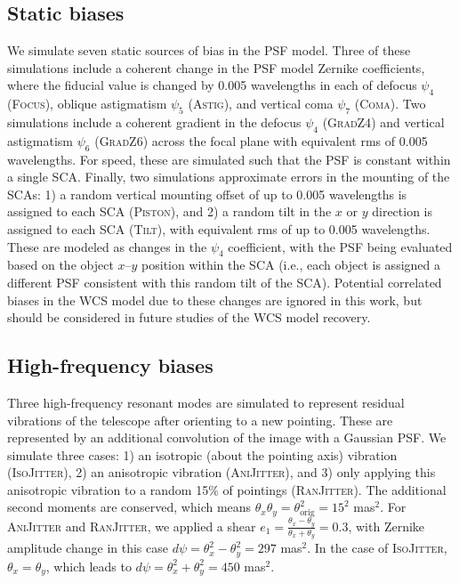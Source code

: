 \documentclass[usenatbib]{mnras}
\begin{document}
\subsection{Static biases}\label{sec:static}

We simulate seven static sources of bias in the PSF model. 
Three of these simulations include a coherent change in the PSF model Zernike coefficients, where the fiducial value is changed by 0.005 wavelengths in each of defocus $\psi_4$ (\textsc{Focus}), oblique astigmatism $\psi_5$ (\textsc{Astig}), and vertical coma $\psi_7$ (\textsc{Coma}). 
Two simulations include a coherent gradient in the defocus $\psi_4$ (\textsc{GradZ4}) and vertical astigmatism $\psi_6$ (\textsc{GradZ6}) across the focal plane with equivalent rms of 0.005 wavelengths. 
For speed, these are simulated such that the PSF is constant within a single SCA. Finally, two simulations approximate errors in the mounting of the SCAs: 1) a random vertical mounting offset of up to 0.005 wavelengths is assigned to each SCA (\textsc{Piston}), and 2) a random tilt in the $x$ or $y$ direction is assigned to each SCA  (\textsc{Tilt}), with equivalent rms of up to 0.005 wavelengths. 
These are modeled as changes in the $\psi_4$ coefficient, with the PSF being evaluated based on the object $x$--$y$ position within the SCA (i.e., each object is assigned a different PSF consistent with this random tilt of the SCA). 
Potential correlated biases in the WCS model due to these changes are ignored in this work, but should be considered in future studies of the WCS model recovery.

\subsection{High-frequency biases}\label{sec:low}

Three high-frequency resonant modes are simulated to represent residual vibrations of the telescope after orienting to a new pointing. 
These are represented by an additional convolution of the image with a Gaussian PSF. We simulate three cases: 1) an isotropic (about the pointing axis) vibration  (\textsc{IsoJitter}), 2) an anisotropic vibration (\textsc{AniJitter}), and 3) only applying this anisotropic vibration to a random 15\% of pointings (\textsc{RanJitter}). 
The additional second moments are conserved, which means $\theta_x\theta_y=\theta_{\mathrm{orig}}^2=15^2$ mas$^2$. 
For \textsc{AniJitter} and \textsc{RanJitter}, we applied a shear $e_1=\frac{\theta_x-\theta_y}{\theta_x+\theta_y}=0.3$,  with Zernike amplitude change in this case  $d\psi=\theta_x^2-\theta_y^2=297$ mas$^2$. 
In the case of \textsc{IsoJitter}, $\theta_x=\theta_y$, which leads to $d\psi=\theta_x^2+\theta_y^2=450$ mas$^2$.
\end{document}
